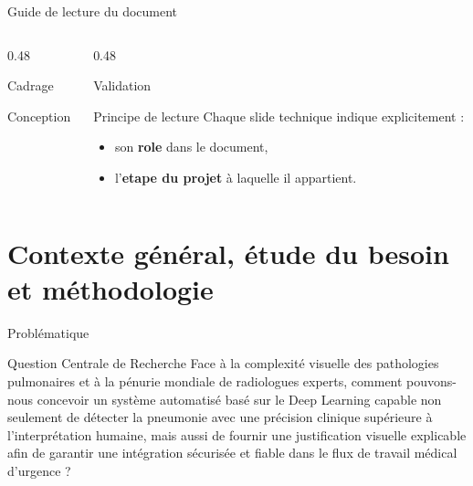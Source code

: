 \begin{frame}{Guide de lecture du document}
\small
\begin{columns}[T,onlytextwidth]
\begin{column}{0.48\textwidth}
\begin{block}{Cadrage}
\end{block}
\begin{block}{Conception}
\end{block}
\end{column}
\begin{column}{0.48\textwidth}
\begin{block}{Validation}
\end{block}
\begin{block}{Principe de lecture}
Chaque slide technique indique explicitement :
\begin{itemize}
\setlength{\itemsep}{0.3em}
\item son \textbf{role} dans le document,
\item l'\textbf{etape du projet} à laquelle il appartient.
\end{itemize}
\end{block}
\end{column}
\end{columns}
\end{frame}

\section{Contexte général, étude du besoin et méthodologie}

\begin{frame}{Problématique}
    \begin{alertblock}{Question Centrale de Recherche}
        Face à la complexité visuelle des pathologies pulmonaires et à la pénurie mondiale de radiologues experts, comment pouvons-nous concevoir un système automatisé basé sur le Deep Learning capable non seulement de détecter la pneumonie avec une précision clinique supérieure à l'interprétation humaine, mais aussi de fournir une justification visuelle explicable afin de garantir une intégration sécurisée et fiable dans le flux de travail médical d'urgence ?
    \end{alertblock}
\end{frame}


